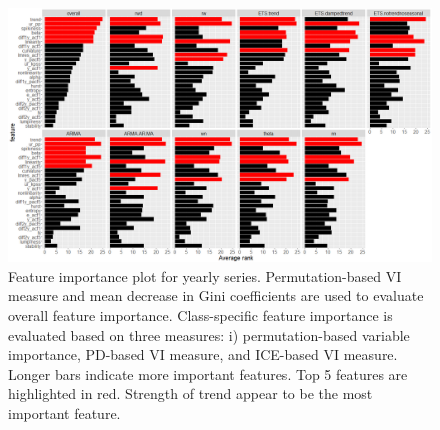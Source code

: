 \documentclass[11pt,a4paper,]{article}
\begin{document}
\begin{figure}
\centering
\includegraphics{figures/viyearly-1.png}
\caption{\label{fig:viyearly}Feature importance plot for yearly series.
Permutation-based VI measure and mean decrease in Gini coefficients are
used to evaluate overall feature importance. Class-specific feature
importance is evaluated based on three measures: i) permutation-based
variable importance, PD-based VI measure, and ICE-based VI measure.
Longer bars indicate more important features. Top 5 features are
highlighted in red. Strength of trend appear to be the most important
feature.}
\end{figure}

\newpage
\end{document}
